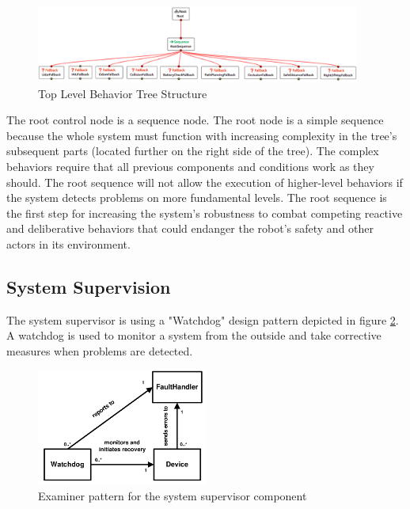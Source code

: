 \begin{figure}[ht]
	\centering
	\includegraphics[width=0.95\textwidth]{images/simplified_bt_inverted.png}
	\caption{Top Level Behavior Tree Structure}
	\label{fig:top_level_bt}
\end{figure}

The root control node is a sequence node. The root node is a simple sequence because the whole system must function with increasing complexity in the tree's subsequent parts (located further on the right side of the tree). The complex behaviors require that all previous components and conditions work as they should. The root sequence will not allow the execution of higher-level behaviors if the system detects problems on more fundamental levels. The root sequence is the first step for increasing the system's robustness to combat competing reactive and deliberative behaviors that could endanger the robot's safety and other actors in its environment. 

\subsection{System Supervision}
\label{subsec:BT System Supervision}

The system supervisor is using a "Watchdog" design pattern depicted in figure \ref{fig:watchdog_pattern}. A watchdog is used to monitor a system from the outside and take corrective measures when problems are detected. 

\begin{figure}[ht]
	\centering
	\includegraphics[width=0.5\textwidth]{images/watchdog_pattern.png}
	\caption{Examiner pattern for the system supervisor component \cite{konrad2003defining}}
	\label{fig:watchdog_pattern}
\end{figure}

